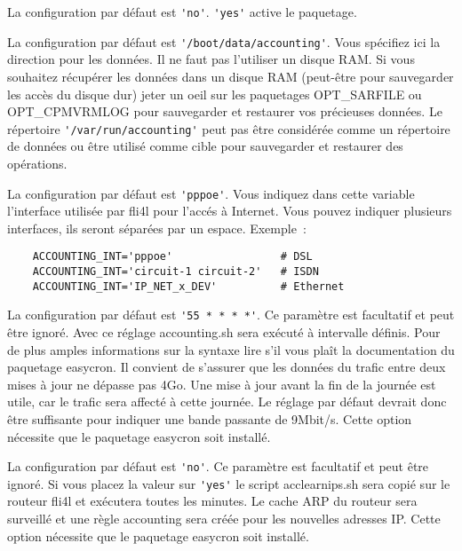 \begin{description}
La configuration par défaut est \verb*?'no'?.
\verb*?'yes'? active le paquetage.

La configuration par défaut est \verb*?'/boot/data/accounting'?.
Vous spécifiez ici la direction pour les données. Il ne faut pas l'utiliser
un disque RAM. Si vous souhaitez récupérer les données dans un disque RAM 
(peut-être pour sauvegarder les accès du disque dur) jeter un oeil sur les
paquetages OPT\_SARFILE ou OPT\_CPMVRMLOG pour sauvegarder et restaurer vos
précieuses données.\newline
Le répertoire \verb*?'/var/run/accounting'? peut pas être considérée comme un
répertoire de données ou être utilisé comme cible pour sauvegarder et restaurer
des opérations.

La configuration par défaut est \verb*?'pppoe'?.
Vous indiquez dans cette variable l'interface utilisée par fli4l pour l'accés à
Internet. Vous pouvez indiquer plusieurs interfaces, ils seront séparées par
un espace.
Exemple~:
\begin{example}
\begin{verbatim}
    ACCOUNTING_INT='pppoe'                 # DSL
    ACCOUNTING_INT='circuit-1 circuit-2'   # ISDN
    ACCOUNTING_INT='IP_NET_x_DEV'          # Ethernet
\end{verbatim}
\end{example}

La configuration par défaut est \verb*?'55 * * * *'?.
Ce paramètre est facultatif et peut être ignoré. Avec ce réglage accounting.sh
sera exécuté à intervalle définis. Pour de plus amples informations sur la
syntaxe lire s'il vous plaît la documentation du paquetage easycron. Il convient
de s'assurer que les données du trafic entre deux mises à jour ne dépasse pas
4Go. Une mise à jour avant la fin de la journée est utile, car le trafic sera
affecté à cette journée. Le réglage par défaut devrait donc être suffisante
pour indiquer une bande passante de 9Mbit/s. Cette option nécessite que le
paquetage easycron soit installé.

La configuration par défaut est \verb*?'no'?.
Ce paramètre est facultatif et peut être ignoré. Si vous placez la valeur sur
\verb*?'yes'? le script acclearnips.sh sera copié sur le routeur fli4l et
exécutera 
toutes les minutes. Le cache ARP du routeur sera surveillé et une règle
accounting sera créée pour les nouvelles adresses IP. Cette option nécessite
que le paquetage easycron soit installé.
\end{description}

